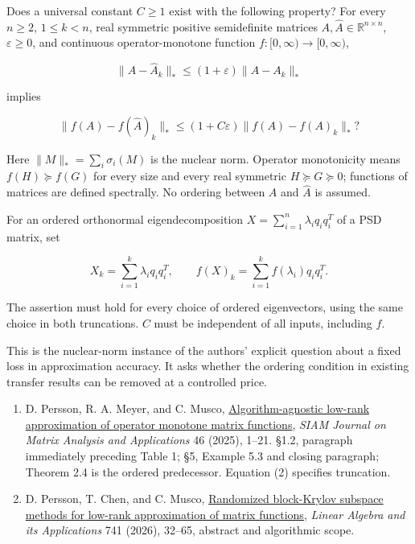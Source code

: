 \documentclass[11pt,a4paper]{article}
\makeatletter
\providecommand{\tightlist}{\setlength{\itemsep}{0pt}\setlength{\parskip}{0pt}}
\renewcommand{\subsection}{\Needspace{4\baselineskip}\@startsection{subsection}{2}{0pt}{9pt plus 1pt minus 1pt}{3pt}{\sffamily\bfseries\normalsize\color{ink}}}
\makeatother
\begin{document}
\newpage
Does a universal constant \(C\ge1\) exist with the following property?
For every \(n\ge2\), \(1\le k<n\), real symmetric positive semidefinite
matrices \(A,\widehat A\in\mathbb R^{n\times n}\), \(\varepsilon\ge0\),
and continuous operator-monotone function \(f:[0,\infty)\to[0,\infty)\),

\[
\|A-\widehat A_k\|_*\le(1+\varepsilon)\|A-A_k\|_*
\]

implies

\[
\|f(A)-f(\widehat A)_k\|_*\le(1+C\varepsilon)\|f(A)-f(A)_k\|_*?
\]

Here \(\|M\|_*=\sum_i\sigma_i(M)\) is the nuclear norm. Operator
monotonicity means \(f(H)\succeq f(G)\) for every size and every real
symmetric \(H\succeq G\succeq0\); functions of matrices are defined
spectrally. No ordering between \(A\) and \(\widehat A\) is assumed.

For an ordered orthonormal eigendecomposition
\(X=\sum_{i=1}^n\lambda_iq_iq_i^T\) of a PSD matrix, set

\[
X_k=\sum_{i=1}^k\lambda_iq_iq_i^T,
\qquad f(X)_k=\sum_{i=1}^kf(\lambda_i)q_iq_i^T.
\]

The assertion must hold for every choice of ordered eigenvectors, using
the same choice in both truncations. \(C\) must be independent of all
inputs, including \(f\).

This is the nuclear-norm instance of the authors' explicit question
about a fixed loss in approximation accuracy. It asks whether the
ordering condition in existing transfer results can be removed at a
controlled price.

\newpage
\subsection{References}\label{references}

\begin{enumerate}
\def\labelenumi{\arabic{enumi}.}
\tightlist
\item
  D. Persson, R. A. Meyer, and C. Musco,
  \href{https://arxiv.org/html/2311.14023v2}{Algorithm-agnostic low-rank
  approximation of operator monotone matrix functions}, \emph{SIAM
  Journal on Matrix Analysis and Applications} 46 (2025), 1--21. §1.2,
  paragraph immediately preceding Table 1; §5, Example 5.3 and closing
  paragraph; Theorem 2.4 is the ordered predecessor. Equation (2)
  specifies truncation.
\item
  D. Persson, T. Chen, and C. Musco,
  \href{https://arxiv.org/abs/2502.01888}{Randomized block-Krylov
  subspace methods for low-rank approximation of matrix functions},
  \emph{Linear Algebra and its Applications} 741 (2026), 32--65,
  abstract and algorithmic scope.
\end{enumerate}
\end{document}
